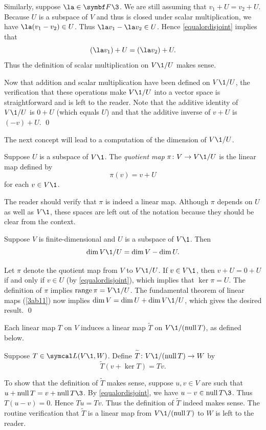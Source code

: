 Similarly, suppose $\la \in \F{}\3$. We are still assuming that $v_1 + U = v_2 + U$. Because $U$ is a subspace of $V$ and thus is closed under scalar multiplication, we have $\la(v_1 - v_2) \in U$. Thus $\la v_1 - \la v_2 \in U$. Hence \ref{equalordisjoint} implies that
\[
(\la v_1) + U = (\la v_2) + U.
\]
Thus the definition of scalar multiplication on $V\1/U$ makes sense.

Now that addition and scalar multiplication have been defined on $V\1/U$, the verification that these operations make $V\1/U$ into a vector space is straightforward and is left to the reader. Note that the additive identity of $V\1/U$ is $0 + U$ (which equals $U$) and that the additive inverse of $v + U$ is $(-v) + U$. \qed

The next concept will lead to a computation of the dimension of $V\1/U$.

{Suppose $U$ is a subspace of $V\1$. The \emph{quotient map} $\pi \colon V \to V\1/U$ is the linear map defined by
\[
\pi(v) = v + U
\]
for each $v \in V\1$.}

The reader should verify that $\pi$ is indeed a linear map. Although $\pi$ depends on $U$ as well as $V\1$, these spaces are left out of the notation because they should be clear from the context.

{Suppose $V$ is finite-dimensional and $U$ is a subspace of $V\1$. Then
\vspace{-.04in}
\[
\dim V\1/U = \dim V - \dim U.
\]}

\proof
Let $\pi$ denote the quotient map from $V$ to $V\1/U$. If $v \in V\1$, then $v + U = 0 + U$ if and only if $v \in U$ (by \ref{equalordisjoint}), which implies that $\ker \pi = U$. The definition of $\pi$ implies $\ran \pi = V\1/U$. The fundamental theorem of linear maps (\ref{3ab11}) now implies
$
\dim V = \dim U + \dim V\1/U$,
which gives the desired result.
\qed

Each linear map $T$ on $V$ induces a linear map $\tilde{T}$ on $V\1/(\ker T)$, as defined below.

{
Suppose $T \in \L(V\1, W)$. Define $\tilde{T} \colon V\1/(\ker T) \to W$ by
\vspace{-.05in}
\[
\tilde{T}(v + \ker T) = Tv.
\]}

To show that the definition of $\tilde{T}$ makes sense, suppose $u, v \in V$ are such that $u + \ker T = v + \ker T\3$. By \ref{equalordisjoint}, we have $u - v \in \ker T\3$. Thus $T(u - v) = 0$. Hence $Tu = Tv$. Thus the definition of $\tilde{T}$ indeed makes sense. The routine verification that $\tilde{T}$ is a linear map from $V\1/(\ker T)$ to $W$ is left to the reader.

